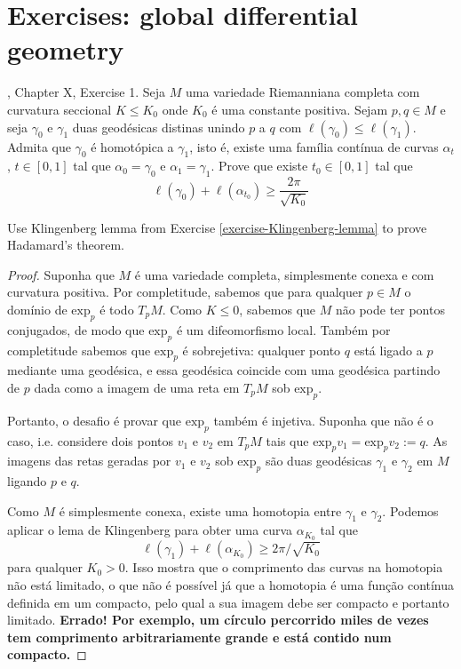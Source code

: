 \section{Exercises: global differential geometry}
\label{section-exercises-global-differential-geometry}

\begin{exercise}
\label{exercise-Klingenberg-lemma}
\cite{doc}, Chapter X, Exercise 1. Seja $M$ uma variedade Riemanniana
completa com curvatura seccional $K \leq  K_0$ onde $K_0$ é uma constante
positiva. Sejam $p,q \in M$ e seja $\gamma_0$ e $\gamma_1$ duas geodésicas
distinas unindo $p$ a $q$ com  $\ell(\gamma_0) \leq  \ell(\gamma_1)$.
Admita que $\gamma_0$ é homotópica a $\gamma_1$, isto é, existe uma família
contínua de curvas $\alpha_t$, $t \in [0,1]$ tal que $\alpha_0 = \gamma_0$
e $\alpha_1=\gamma_1$. Prove que existe $t_0 \in [0,1]$ tal que
$$
\ell(\gamma_0)+\ell(\alpha_{t_0}) \geq  \frac{2\pi}{\sqrt{K_0} }
$$
\end{exercise}

\begin{exercise}
\label{exercise-Hadamard-via-Kingenberg}
Use Klingenberg lemma from Exercise \ref{exercise-Klingenberg-lemma} to prove
Hadamard's theorem.
\end{exercise}

\begin{proof}
Suponha que $M$ é uma variedade completa, simplesmente conexa e com curvatura
positiva. Por completitude, sabemos que para qualquer $p \in M$ o domínio de
$\text{exp}_p$ é todo $T_pM$. Como $K\leq 0$, sabemos que $M$
não pode ter pontos conjugados, de modo que $\text{exp}_p$ é um
difeomorfismo local. Também por completitude sabemos que
$\text{exp}_p$ é sobrejetiva: qualquer ponto $q$ está ligado a $p$
mediante uma geodésica, e essa geodésica coincide com uma geodésica partindo de
$p$ dada como a imagem de uma reta em $T_pM$ sob $\text{exp}_p$.

Portanto, o desafio é provar que $\text{exp}_p$ também é injetiva.
Suponha que não é o caso, i.e. considere dois pontos $v_1$ e $v_2$ em
$T_pM$ tais que $\text{exp}_pv_1=\text{exp}_pv_2:=q$. As
imagens das retas geradas por $v_1$ e $v_2$ sob $\text{exp}_p$ são
duas geodésicas $\gamma_1$ e $\gamma_2$ em $M$ ligando $p$ e $q$.

Como $M$ é simplesmente conexa, existe uma homotopia entre $\gamma_1$ e
$\gamma_2$. Podemos aplicar o lema de Klingenberg para obter uma curva
$\alpha_{K_0}$ tal que $$ \ell(\gamma_1)+\ell(\alpha_{K_0}) \geq
2\pi/\sqrt{K_0} $$ para qualquer $K_0>0$. Isso mostra que o comprimento das
curvas na homotopia não está limitado, o que não é possível já que a homotopia é
uma função contínua definida em um compacto, pelo qual a sua imagem debe ser
compacto e portanto limitado. {\bf Errado! Por exemplo, um círculo percorrido
miles de vezes tem comprimento arbitrariamente grande e está contido num
compacto.}
\end{proof}


